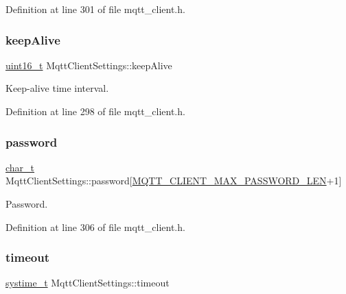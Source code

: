 Definition at line 301 of file mqtt\+\_\+client.\+h.

\mbox{\label{structMqttClientSettings_a102bcc25a927bd27d513307171aa0411}} 
\subsubsection{\texorpdfstring{keep\+Alive}{keepAlive}}
{\footnotesize\ttfamily \hyperlink{stdint_8h_a273cf69d639a59973b6019625df33e30}{uint16\+\_\+t} Mqtt\+Client\+Settings\+::keep\+Alive}



Keep-\/alive time interval. 



Definition at line 298 of file mqtt\+\_\+client.\+h.

\mbox{\label{structMqttClientSettings_a7ab23630ef83e2b04878c570414443da}} 
\subsubsection{\texorpdfstring{password}{password}}
{\footnotesize\ttfamily \hyperlink{compiler__port_8h_a40bb5262bf908c328fbcfbe5d29d0201}{char\+\_\+t} Mqtt\+Client\+Settings\+::password\mbox{[}\hyperlink{mqtt__client_8h_aca81e074a297064ed384ac6ad661c228}{M\+Q\+T\+T\+\_\+\+C\+L\+I\+E\+N\+T\+\_\+\+M\+A\+X\+\_\+\+P\+A\+S\+S\+W\+O\+R\+D\+\_\+\+L\+EN}+1\mbox{]}}



Password. 



Definition at line 306 of file mqtt\+\_\+client.\+h.

\mbox{\label{structMqttClientSettings_a7ce9eacc362961f8cebe0cbeab800965}} 
\subsubsection{\texorpdfstring{timeout}{timeout}}
{\footnotesize\ttfamily \hyperlink{compiler__port_8h_ae3e32a98d431a02106616da3071832dd}{systime\+\_\+t} Mqtt\+Client\+Settings\+::timeout}



